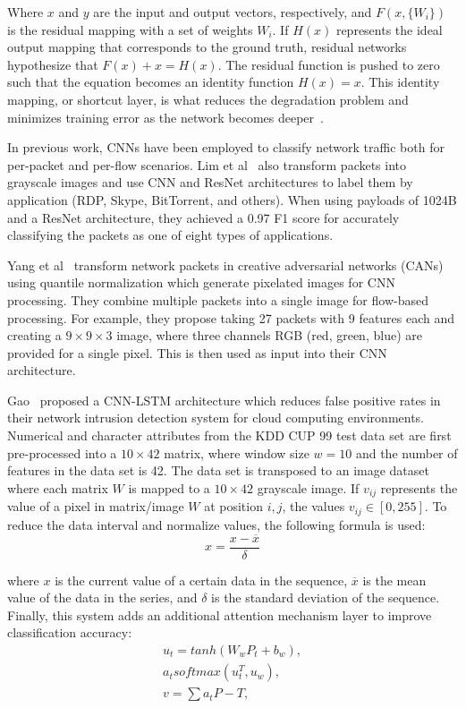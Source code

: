 Where $x$ and $y$ are the input and output vectors, respectively, and $F(x, \{W_i\})$ is the residual mapping with a set of weights $W_i$. If $H(x)$ represents the ideal output mapping that corresponds to the ground truth, residual networks hypothesize that $F(x) + x = H(x)$. The residual function is pushed to zero such that the equation becomes an identity function $H(x) = x$. This identity mapping, or shortcut layer, is what reduces the degradation problem and minimizes training error as the network becomes deeper~\cite{resnet}.


In previous work, CNNs have been employed to classify network traffic both for per-packet and per-flow scenarios. Lim et al~\cite{lim2019network} also transform packets into grayscale images and use CNN and ResNet architectures to label them by application (RDP, Skype, BitTorrent, and others). When using payloads of 1024B and a ResNet architecture, they achieved a 0.97 F1 score for accurately classifying the packets as one of eight types of applications.

Yang et al~\cite{yang2022} transform network packets in creative adversarial networks (CANs) using quantile normalization which generate pixelated images for CNN processing. They combine multiple packets into a single image for flow-based processing. For example, they propose taking 27 packets with 9 features each and creating a $9 \times 9 \times 3$ image, where three channels RGB (red, green, blue) are provided for a single pixel. This is then used as input into their CNN architecture.

Gao~\cite{Gao2022} proposed a CNN-LSTM architecture which reduces false positive rates in their network intrusion detection system for cloud computing environments. Numerical and character attributes from the KDD CUP 99 test data set are first pre-processed into a $10 \times 42$ matrix, where window size $w = 10$ and the number of features in the data set is 42. The data set is transposed to an image dataset where each matrix $W$ is mapped to a $10 \times 42$ grayscale image. If $v_{ij}$ represents the value of a pixel in matrix/image $W$ at position $i,j$, the values $v_{ij} \in [0,255]$. To reduce the data interval and normalize values, the following formula is used:
\begin{equation}
    x = \frac{x-\overline{x}}{\delta}
\end{equation}

where $x$ is the current value of a certain data in the sequence, $\overline{x}$ is the mean value of the data in the series, and $\delta$ is the standard deviation of the sequence. Finally, this system adds an additional attention mechanism layer to improve classification accuracy:
\begin{equation}
    \begin{split}
    u_t = tanh(W_wP_t + b_w), \\
    a_t softmax(u_t^T, u_w), \\
    v = \sum a_tP-T,
    \end{split}
\end{equation}

